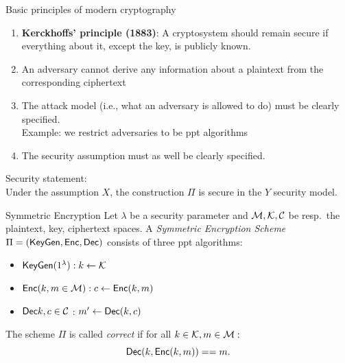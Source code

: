 \documentclass[usenames,dvipsnames, 9pt,aspectratio=169]{beamer}
\begin{document}
\begin{frame}{Basic principles of modern cryptography}
\large
	\begin{enumerate}
		\item \textbf{Kerckhoffs’ principle (1883)}:
		A cryptosystem should remain secure if everything about it, except the key, is publicly known.
		\item An adversary cannot derive any information about a plaintext from the corresponding ciphertext
		\item The attack model (i.e., what an adversary is allowed to do) must be clearly specified. \\
		Example: we restrict adversaries to be ppt algorithms
		\item The security assumption must as well be clearly specified. \\
	\end{enumerate}
	\pause
	\vspace{10pt}
	\centering
	 Security statement: \\
	\LARGE
	Under the assumption $X$, the construction $\Pi$ is secure in the $Y$ security model.
\end{frame}

\begin{frame}{Symmetric Encryption}
\Large
	Let $\lambda$ be a security parameter and $\mathcal{M}, \mathcal{K}, \mathcal{C}$ be resp.\ the plaintext, key, ciphertext spaces.
	A \emph{Symmetric Encryption Scheme} $\Pi = (\textsf{KeyGen}, \textsf{Enc}, \textsf{Dec} )$ consists of three ppt algorithms: \\
	\begin{itemize}
		\item $\textsf{KeyGen}(1^\lambda): k \leftarrow \mathcal{K}$ \\[10pt]
		\item $\textsf{Enc}(k, m \in \mathcal{M}): c \leftarrow \textsf{Enc}(k, m)$ \\[10pt]
		\item $\textsf{Dec}{k, c \in \ensuremath{\mathcal{C}}}$ : $m' \leftarrow \textsf{Dec}(k, c)$
	\end{itemize}
\pause
\vspace{20pt}
	The scheme $\Pi$ is called \emph{correct} if for all $k \in \mathcal{K}, m \in \mathcal{M}:$
	\[
		\textsf{Dec}(k, \textsf{Enc}(k, m)) == m.
	\]
\end{frame}
\end{document}
